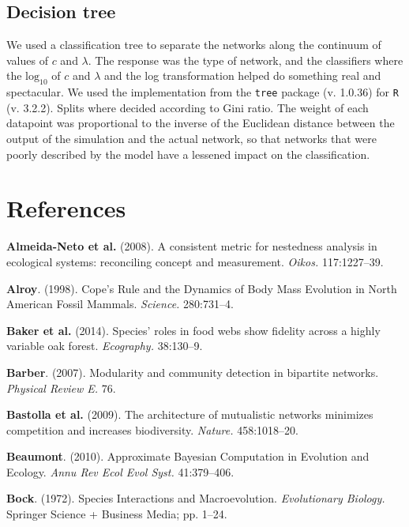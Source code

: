 \documentclass[12pt]{article}
\begin{document}
\subsection{Decision tree}\label{decision-tree}

We used a classification tree to separate the networks along the
continuum of values of \(c\) and \(\lambda\). The response was the type
of network, and the classifiers where the \(\text{log}_{10}\) of \(c\)
and \(\lambda\) and the log transformation helped do something real and
spectacular. We used the implementation from the \texttt{tree} package
(v. 1.0.36) for \texttt{R} (v. 3.2.2). Splits where decided according to
Gini ratio. The weight of each datapoint was proportional to the inverse
of the Euclidean distance between the output of the simulation and the
actual network, so that networks that were poorly described by the model
have a lessened impact on the classification.

\section*{References}\label{references}

\hypertarget{refs}{}
\hypertarget{ref-alme08cmn}{}
\textbf{Almeida-Neto et al.} (2008). A consistent metric for nestedness
analysis in ecological systems: reconciling concept and measurement.
\emph{Oikos.} 117:1227--39.

\hypertarget{ref-alro98crd}{}
\textbf{Alroy}. (1998). Cope's Rule and the Dynamics of Body Mass
Evolution in North American Fossil Mammals. \emph{Science.} 280:731--4.

\hypertarget{ref-bake14srf}{}
\textbf{Baker et al.} (2014). Species' roles in food webs show fidelity
across a highly variable oak forest. \emph{Ecography.} 38:130--9.

\hypertarget{ref-barb07mcd}{}
\textbf{Barber}. (2007). Modularity and community detection in bipartite
networks. \emph{Physical Review E.} 76.

\hypertarget{ref-bast09amn}{}
\textbf{Bastolla et al.} (2009). The architecture of mutualistic
networks minimizes competition and increases biodiversity.
\emph{Nature.} 458:1018--20.

\hypertarget{ref-beau10abc}{}
\textbf{Beaumont}. (2010). Approximate Bayesian Computation in Evolution
and Ecology. \emph{Annu Rev Ecol Evol Syst.} 41:379--406.

\hypertarget{ref-bock72sim}{}
\textbf{Bock}. (1972). Species Interactions and Macroevolution.
\emph{Evolutionary Biology.} Springer Science + Business Media; pp.
1--24.
\end{document}

